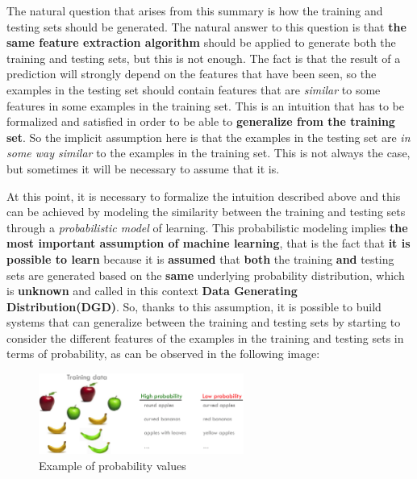 The natural question that arises from this summary is how the training
and testing sets should be generated. The natural answer to this
question is that \textbf{the same feature extraction algorithm}
should be applied to generate both the training and testing sets, but
this is not enough. The fact is that the result of a prediction will
strongly depend on the features that have been seen, so the examples in
the testing set should contain features that are \emph{similar} to some
features in some examples in the training set. This is an intuition that
has to be formalized and satisfied in order to be able to
\textbf{generalize from the training set}. So the implicit
assumption here is that the examples in the testing set are
\emph{in some way similar} to the examples in the training set.
This is not always the case, but sometimes it will be necessary
to assume that it is.

At this point, it is necessary to formalize the intuition described
above and this can be achieved by modeling the similarity between
the training and testing sets through a \emph{probabilistic model}
of learning. This probabilistic modeling implies
\textbf{the most important assumption of machine learning},
that is the fact that \textbf{it is possible to learn} because it is
\textbf{assumed} that \textbf{both} the training
\textbf{and} testing sets are generated based on the \textbf{same}
underlying probability distribution, which is \textbf{unknown} and
called in this context \textbf{Data Generating Distribution(DGD)}.
So, thanks to this assumption, it is possible to build systems that
can generalize between the training and testing sets by starting to
consider the different features of the examples in the training
and testing sets in terms of probability, as can be observed in the
following image:

\vspace{5mm}

\begin{figure}[h]
      \centering
      \includegraphics[width=0.6\textwidth]{../img/Testing_set_prob}
      \caption{Example of probability values}
\end{figure}

